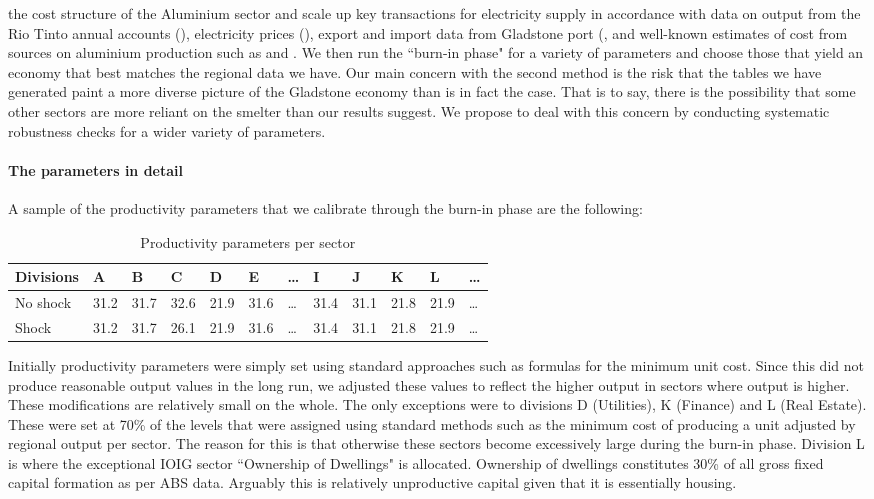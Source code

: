 \documentclass[12pt,a4paper]{article}
\begin{document}
the cost structure of the Aluminium sector and scale up key transactions for
electricity supply in accordance with data on output from the Rio Tinto annual
accounts (\cite{RT}), electricity prices (\cite{AEMO}), export and import data
from Gladstone port (\cite{port}, and well-known estimates of cost from sources
on aluminium production such as \cite{GN-Aluminium-smelters} and \cite{bat}.
We then run the ``burn-in phase" for a variety of parameters and choose those
that yield an economy that best matches the regional data we have.  Our main
concern with the second method is the risk that the tables we have generated
paint a more diverse picture of the Gladstone economy than is in fact the case.
That is to say, there is the possibility that some other sectors are more
reliant on the smelter than our results suggest. We propose to deal with this
concern by conducting systematic robustness checks for a wider variety of
parameters.

\paragraph{The parameters in detail} A sample of the productivity parameters
that we calibrate through the burn-in phase are the following:

\begin{table}[H]
\centering
  \caption{\label{tab-prod} Productivity parameters per sector}
\begin{tabular}{l|l|l|l|l|l|l|l|l|l|l|l}

  Divisions &  A  & B  & C  & D  & E  & \dots  & I  & J  & K  & L & \dots \\

\hline

  No shock & 31.2 & 31.7 & 32.6 & 21.9 & 31.6 & \dots & 31.4 & 31.1 & 21.8 &
  21.9 & \dots\\

\hline

  Shock & 31.2 & 31.7 & {\color{red}26.1} & 21.9 & 31.6 & \dots & 31.4 & 31.1 &
  21.8 & 21.9 & \dots\\

\end{tabular}
\end{table}
 
Initially productivity parameters were simply set using standard approaches
such as formulas for the minimum unit cost. Since this did not produce
reasonable output values in the long run, we adjusted these values to reflect
the higher output in sectors where output is higher.  These modifications are
relatively small on the whole.  The only exceptions were to divisions D
(Utilities), K (Finance) and L (Real Estate). These were set at 70\% of the
levels that were assigned using standard methods such as the minimum cost of
producing a unit adjusted by regional output per sector.  The reason for this
is that otherwise these sectors become excessively large during the burn-in
phase. Division L is where the exceptional IOIG sector ``Ownership of
Dwellings" is allocated. Ownership of dwellings constitutes 30\% of all gross
fixed capital formation as per ABS data. Arguably this is relatively
unproductive capital given that it is essentially housing.
\end{document}
